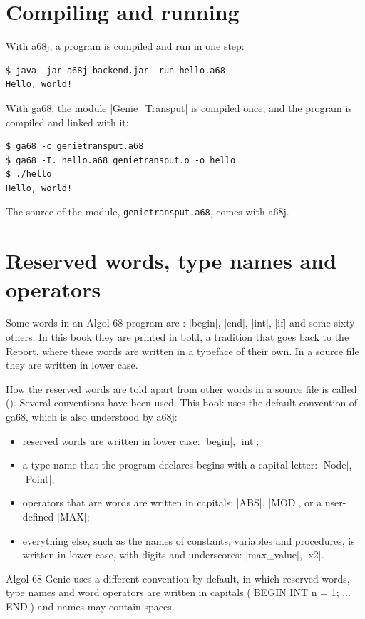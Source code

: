 \section{Compiling and running}

With a68j, a program is compiled and run in one step:

\begin{lstlisting}[style=shell]
$ java -jar a68j-backend.jar -run hello.a68
Hello, world!
\end{lstlisting}

With ga68, the module \code|Genie_Transput| is compiled once, and the
program is compiled and linked with it:

\begin{lstlisting}[style=shell]
$ ga68 -c genietransput.a68
$ ga68 -I. hello.a68 genietransput.o -o hello
$ ./hello
Hello, world!
\end{lstlisting}

The source of the module, \texttt{genietransput.a68}, comes with a68j.

\section{Reserved words, type names and operators}\label{sec-stropping}

Some words in an Algol 68 program are : \code|begin|,
\code|end|, \code|int|, \code|if| and some sixty others. In this book
they are printed in bold, a tradition that goes back to the Report, where
these words are written in a typeface of their own. In a source file they
are written in lower case.

How the reserved words are told apart from other words in a source file is
called  (). Several conventions have been
used. This book uses the default convention of ga68, which is also
understood by a68j:
\begin{itemize}
\item reserved words are written in lower case: \code|begin|, \code|int|;
\item a type name that the program declares begins with a capital letter:
  \code|Node|, \code|Point|;
\item operators that are words are written in capitals: \code|ABS|,
  \code|MOD|, or a user-defined \code|MAX|;
\item everything else, such as the names of constants, variables and
  procedures, is written in lower case, with digits and underscores:
  \code|max_value|, \code|x2|.
\end{itemize}
Algol 68 Genie uses a different convention by default, in which reserved
words, type names and word operators are written in capitals
(\code|BEGIN INT n = 1; ... END|) and names may contain spaces.

